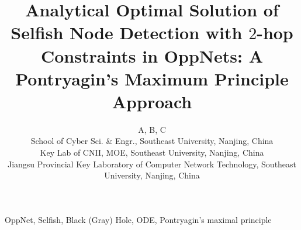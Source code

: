 \documentclass[10pt,conference]{IEEEtran}
\begin{document}
%
\title{
Analytical Optimal Solution of Selfish Node Detection with $2$-hop Constraints in OppNets: A Pontryagin's Maximum Principle Approach
}
\author{A, B, C\\
        School of Cyber Sci. \& Engr., Southeast University, Nanjing, China\\
        Key Lab of CNII, MOE, Southeast University, Nanjing, China\\
        Jiangsu Provincial Key Laboratory of Computer Network Technology, Southeast University, Nanjing, China\\
        }
\maketitle



%
\begin{IEEEkeywords}
OppNet, Selfish, Black (Gray) Hole, ODE, Pontryagin's maximal principle
\end{IEEEkeywords}












\end{document}
